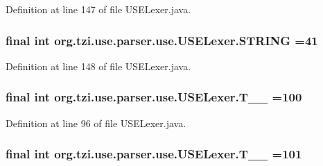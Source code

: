Definition at line 147 of file U\-S\-E\-Lexer.\-java.

\hypertarget{classorg_1_1tzi_1_1use_1_1parser_1_1use_1_1_u_s_e_lexer_abe60b02ebf8220404f1ede961f368647}{
\subsubsection[{S\-T\-R\-I\-N\-G}]{\setlength{\rightskip}{0pt plus 5cm}final int org.\-tzi.\-use.\-parser.\-use.\-U\-S\-E\-Lexer.\-S\-T\-R\-I\-N\-G =41\hspace{0.3cm}{\ttfamily [static]}}}\label{classorg_1_1tzi_1_1use_1_1parser_1_1use_1_1_u_s_e_lexer_abe60b02ebf8220404f1ede961f368647}


Definition at line 148 of file U\-S\-E\-Lexer.\-java.

\hypertarget{classorg_1_1tzi_1_1use_1_1parser_1_1use_1_1_u_s_e_lexer_a7cd7914418a05e6a8f693de72854c726}{
\subsubsection[{T\-\_\-\-\_\-100}]{\setlength{\rightskip}{0pt plus 5cm}final int org.\-tzi.\-use.\-parser.\-use.\-U\-S\-E\-Lexer.\-T\-\_\-\-\_ =100\hspace{0.3cm}{\ttfamily [static]}}}\label{classorg_1_1tzi_1_1use_1_1parser_1_1use_1_1_u_s_e_lexer_a7cd7914418a05e6a8f693de72854c726}


Definition at line 96 of file U\-S\-E\-Lexer.\-java.

\hypertarget{classorg_1_1tzi_1_1use_1_1parser_1_1use_1_1_u_s_e_lexer_a2ecf1386192a3bfd284249900c1e4a3f}{
\subsubsection[{T\-\_\-\-\_\-101}]{\setlength{\rightskip}{0pt plus 5cm}final int org.\-tzi.\-use.\-parser.\-use.\-U\-S\-E\-Lexer.\-T\-\_\-\-\_ =101\hspace{0.3cm}{\ttfamily [static]}}}\label{classorg_1_1tzi_1_1use_1_1parser_1_1use_1_1_u_s_e_lexer_a2ecf1386192a3bfd284249900c1e4a3f}


